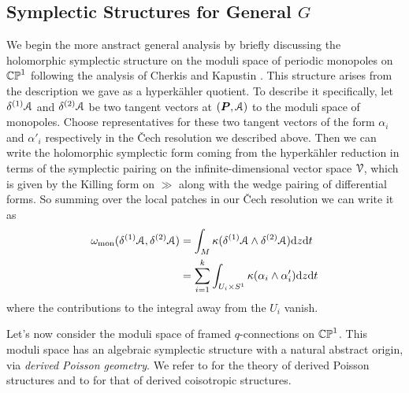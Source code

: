 \documentclass[10pt, oneside]{article}
\renewcommand{\d}{\mathrm{d}}
\begin{document}
\subsection{Symplectic Structures for General $G$}
We begin the more anstract general analysis by briefly discussing the holomorphic symplectic structure on the moduli space of periodic monopoles on $\mathbb{CP}^1$ following the analysis of Cherkis and Kapustin \cite{CherkisKapustin1, CherkisKapustin3}.  This structure arises from the description we gave as a hyperk\"ahler quotient.  To describe it specifically, let $\delta^{(1)} \mathcal{A}$ and $\delta^{(2)} \mathcal{A}$ be two tangent vectors at $(\boldsymbol{P}, \mathcal{A})$ to the moduli space of monopoles.  Choose representatives for these two tangent vectors of the form $\alpha_i$ and $\alpha'_i$ respectively  in the \v Cech resolution we described above.  Then we can write the holomorphic symplectic form coming from the hyperk\"ahler reduction in terms of the symplectic pairing on the infinite-dimensional vector space $\mathcal{V}$, which is given by the Killing form on $\gg$ along with the wedge pairing of differential forms.  So summing over the local patches in our \v Cech resolution we can write it as
\begin{align*}
\omega_{\mr{mon}}(\delta^{(1)} \mc A, \delta^{(2)} \mc A) &= \int_{M} \kappa(\delta^{(1)} \mc A \wedge \delta^{(2)} \mc A) \d z \d t \\
&= \sum_{i=1}^k \int_{U_i \times S^1} \kappa(\alpha_i \wedge \alpha'_i) \d z \d t
\end{align*}
where the contributions to the integral away from the $U_i$ vanish.

 

Let's now consider the moduli space of framed $q$-connections on $\mathbb{CP}^1$.  This moduli space has an algebraic symplectic structure with a natural abstract origin, via \emph{derived Poisson geometry}.  We refer to \cite{CPTVV} for the theory of derived Poisson structures and to \cite{MelaniSafronov1, MelaniSafronov2, Spaide} for that of derived coisotropic structures.
\end{document}
